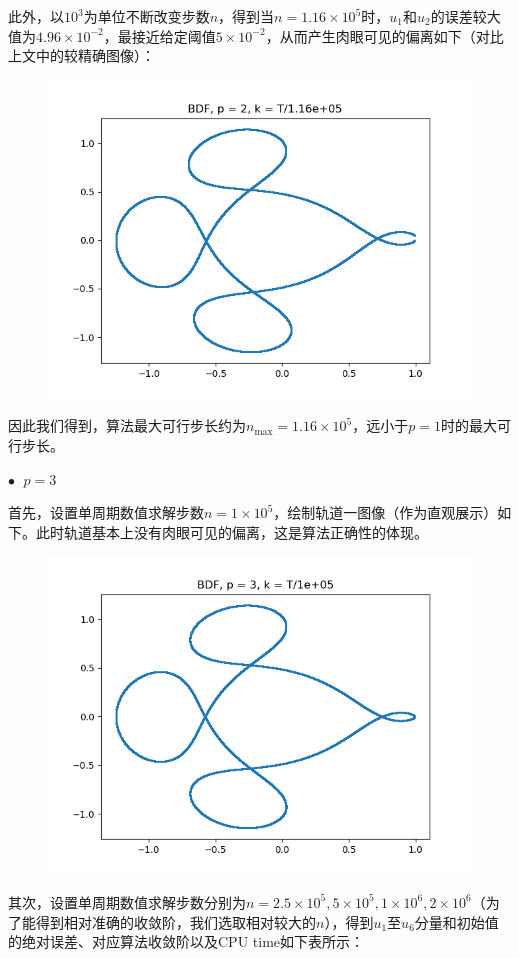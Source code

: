 \documentclass{ctexart}
\begin{document}
\begin{sloppypar}
此外，以$10^3$为单位不断改变步数$n$，得到当$n = 1.16 \times 10^5$时，$u_1$和$u_2$的误差较大值为$4.96 \times 10^{-2}$，最接近给定阈值$5 \times 10^{-2}$，从而产生肉眼可见的偏离如下（对比上文中的较精确图像）：
\begin{figure}[H]
\centering
\includegraphics[scale = 0.45]{./report_src/Figure_20.png}
\end{figure}
因此我们得到，算法最大可行步长约为$n_{\max} = 1.16 \times 10^5$，远小于$p=1$时的最大可行步长。

$\bullet \;$ $p = 3$

首先，设置单周期数值求解步数$n = 1 \times 10^5$，绘制轨道一图像（作为直观展示）如下。此时轨道基本上没有肉眼可见的偏离，这是算法正确性的体现。
\begin{figure}[H]
\centering
\includegraphics[scale = 0.45]{./report_src/Figure_21.png}
\end{figure}
其次，设置单周期数值求解步数分别为$n = 2.5 \times 10^5,5 \times 10^5,1 \times 10^6, 2 \times 10^6$（为了能得到相对准确的收敛阶，我们选取相对较大的$n$），得到$u_1$至$u_6$分量和初始值的绝对误差、对应算法收敛阶以及CPU time如下表所示：


\end{sloppypar}
\end{document}

